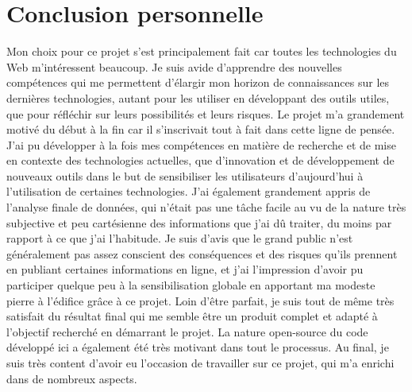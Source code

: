 \section{Conclusion personnelle}

	Mon choix pour ce projet s'est principalement fait car toutes les technologies du Web m'intéressent beaucoup. Je suis avide d'apprendre des nouvelles compétences qui me permettent d'élargir mon horizon de connaissances sur les dernières technologies, autant pour les utiliser en développant des outils utiles, que pour réfléchir sur leurs possibilités et leurs risques. Le projet m'a grandement motivé du début à la fin car il s'inscrivait tout à fait dans cette ligne de pensée.
	J'ai pu développer à la fois mes compétences en matière de recherche et de mise en contexte des technologies actuelles, que d'innovation et de développement de nouveaux outils dans le but de sensibiliser les utilisateurs d'aujourd'hui à l'utilisation de certaines technologies. J'ai également grandement appris de l'analyse finale de données, qui n'était pas une tâche facile au vu de la nature très subjective et peu cartésienne des informations que j'ai dû traiter, du moins par rapport à ce que j'ai l’habitude.
	Je suis d'avis que le grand public n'est généralement pas assez conscient des conséquences et des risques qu'ils prennent en publiant certaines informations en ligne, et j'ai l'impression d'avoir pu participer quelque peu à la sensibilisation globale en apportant ma modeste pierre à l'édifice grâce à ce projet. Loin d'être parfait, je suis tout de même très satisfait du résultat final qui me semble être un produit complet et adapté à l'objectif recherché en démarrant le projet.
	La nature open-source du code développé ici a également été très motivant dans tout le processus.
	Au final, je suis très content d'avoir eu l'occasion de travailler sur ce projet, qui m'a enrichi dans de nombreux aspects. 